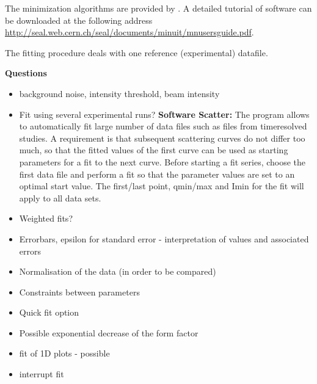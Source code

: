 The minimization algorithms are provided by . A detailed tutorial of  software can be downloaded at the
following address \url{http://seal.web.cern.ch/seal/documents/minuit/mnusersguide.pdf}.


The fitting procedure deals with one reference (experimental) datafile. 
 
\textbf{Questions}
\begin{itemize}
\item background noise, intensity threshold, beam intensity 
\item Fit using several experimental runs?
\textbf{ Software Scatter:} The program allows to automatically fit large number of data files such as files from timeresolved
studies. A requirement is that subsequent scattering curves do not differ too much, so
that the fitted values of the first curve can be used as starting parameters for a fit to the next
curve. Before starting a fit series, choose the first data file and perform a fit so that the
parameter values are set to an optimal start value. The first/last point, qmin/max and Imin for
the fit will apply to all data sets.
\item Weighted fits?
\item Errorbars, epsilon for standard error - interpretation of values
  and associated errors
\item Normalisation of the data (in order to be compared)
\item Constraints between parameters
\item Quick fit option
\item Possible exponential decrease of the form factor
\item fit of 1D plots - possible
\item interrupt fit
\end{itemize}

